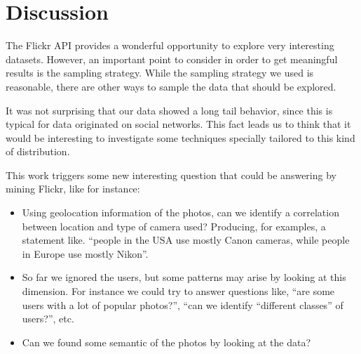 \documentclass[letter,12pt]{article}
\begin{document}
\section{Discussion}

The Flickr API provides a wonderful opportunity to explore very interesting datasets. However, an important point to consider in order to get meaningful results is the sampling strategy. While the sampling strategy we used is reasonable, there are other ways to sample the data that should be explored.

It was not surprising that our data showed a long tail behavior, since this is typical for data originated on social networks. This fact leads us to think that it would be interesting to investigate some techniques specially tailored to this kind of distribution.

This work triggers some new interesting question that could be answering by mining Flickr, like for instance:
\begin{itemize}
\item Using geolocation information of the photos, can we identify a correlation between location and type of camera used? Producing, for examples, a statement like. ``people in the USA use mostly Canon cameras, while people in Europe use mostly Nikon''.
\item So far we ignored the users, but some patterns may arise by looking at this dimension. For instance we could try to answer questions like, ``are some users with a lot of popular photos?'', ``can we identify ``different classes'' of users?'', etc.
\item Can we found some semantic of the photos by looking at the data?
\end{itemize}



\end{document}
